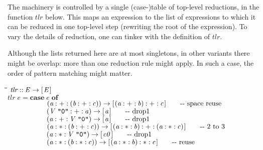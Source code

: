 \documentclass{article}
\newlength{\lwidth}\setlength{\lwidth}{4.5cm}
\newlength{\cwidth}\setlength{\cwidth}{8mm} %
\newcommand{\Conid}[1]{\mathit{#1}}
\newcommand{\Varid}[1]{\mathit{#1}}
\begin{document}
The machinery is controlled by a single (case-)table of top-level
reductions, in the function \ensuremath{\Varid{tlr}} below.
This maps an expression to the list of expressions to which it
can be reduced in one top-level step (rewriting the root of the expression).  
To vary the details of reduction, one can tinker with the definition
of \ensuremath{\Varid{tlr}}.  

Although the lists returned here are at most singletons, in other variants
there might be overlap: more than one reduction rule might apply.  In such a case,
the order of pattern matching might matter.
\begin{tabbing}
\qquad\=\hspace{\lwidth}\=\hspace{\cwidth}\=\+\kill
${\Varid{tlr}\mathbin{::}\Conid{E}\to [\mskip1.5mu \Conid{E}\mskip1.5mu]}$\\
${\Varid{tlr}\;\Varid{e}\mathrel{=}\mathbf{case}\;\Varid{e}\;\mathbf{of}}$\\
${\phantom{\Varid{tlr}\;\Varid{e}\mathrel{=}\mathbf{case}\;\mbox{}}(\Varid{a}\mathbin{:+:}(\Varid{b}\mathbin{:+:}\Varid{c}))\to [\mskip1.5mu (\Varid{a}\mathbin{:+:}\Varid{b})\mathbin{:+:}\Varid{c}\mskip1.5mu]\mbox{\qquad-{}-  space reuse}}$\\
${\phantom{\Varid{tlr}\;\Varid{e}\mathrel{=}\mathbf{case}\;\mbox{}}(\Conid{V}\;\text{\ttfamily \char34 0\char34}\mathbin{:+:}\Varid{a})\to [\mskip1.5mu \Varid{a}\mskip1.5mu]\mbox{\qquad-{}-  drop1}}$\\
${\phantom{\Varid{tlr}\;\Varid{e}\mathrel{=}\mathbf{case}\;\mbox{}}(\Varid{a}\mathbin{:+:}\Conid{V}\;\text{\ttfamily \char34 0\char34})\to [\mskip1.5mu \Varid{a}\mskip1.5mu]\mbox{\qquad-{}-  drop1}}$\\
${\phantom{\Varid{tlr}\;\Varid{e}\mathrel{=}\mathbf{case}\;\mbox{}}(\Varid{a}\mathbin{:*:}(\Varid{b}\mathbin{:+:}\Varid{c}))\to [\mskip1.5mu (\Varid{a}\mathbin{:*:}\Varid{b})\mathbin{:+:}(\Varid{a}\mathbin{:*:}\Varid{c})\mskip1.5mu]\mbox{\qquad-{}-  2 to 3}}$\\
${\phantom{\Varid{tlr}\;\Varid{e}\mathrel{=}\mathbf{case}\;\mbox{}}(\Varid{a}\mathbin{:*:}\Conid{V}\;\text{\ttfamily \char34 0\char34})\to [\mskip1.5mu \Varid{c0}\mskip1.5mu]\mbox{\qquad-{}-  drop1}}$\\
${\phantom{\Varid{tlr}\;\Varid{e}\mathrel{=}\mathbf{case}\;\mbox{}}(\Varid{a}\mathbin{:*:}(\Varid{b}\mathbin{:*:}\Varid{c}))\to [\mskip1.5mu (\Varid{a}\mathbin{:*:}\Varid{b})\mathbin{:*:}\Varid{c}\mskip1.5mu]\mbox{\qquad-{}-  reuse}}$\\

\end{tabbing}
\end{document}
